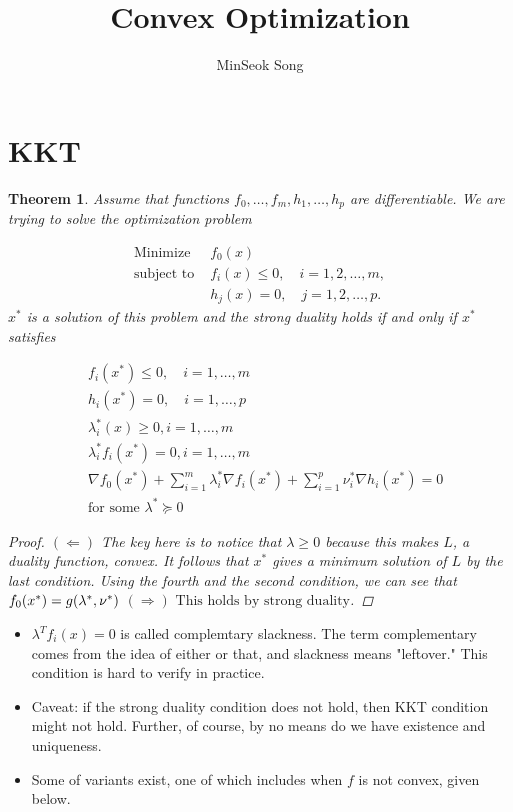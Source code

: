 \documentclass{article}
\title{Convex Optimization}
\author{MinSeok Song}
\date{}
\newtheorem{theorem}{Theorem}
\theoremstyle{remark}
\begin{document}
\maketitle
\section*{KKT}
\begin{theorem}
Assume that functions $f_0,\dots,f_m,h_1,\dots,h_p$ are differentiable. We
 are trying to solve the optimization problem

\begin{align*}
        \text{Minimize } & f_0(x) \\
        \text{subject to } & f_i(x) \leq 0, \quad i = 1, 2, \ldots, m, \\
        & h_j(x) = 0, \quad j = 1, 2, \ldots, p.
        \end{align*}
$x^*$ is a solution of this problem and the strong duality holds if and only if $x^*$ satisfies

\begin{align*}
        & f_i (x^*)\leq 0,\quad i=1,\dots,m\\
        & h_i(x^*)=0,\quad i=1,\dots ,p\\
        & \lambda_i^*(x)\geq 0,i=1,\dots,m\\
        &\lambda_i^* f_i(x^*)=0,i=1,\dots,m\\
        &\nabla f_0(x^*)+\sum^m_{i=1}\lambda_i^*\nabla f_i(x^*)+\sum^p_{i=1}\nu_i^* \nabla h_i(x^*)=0\\
        & \text{for some } \lambda^*\succeq 0
\end{align*}

\begin{proof}
        $(\Leftarrow)$ The key here is to notice that 
        $\lambda \geq 0$ because this makes $L$, a duality function, convex.
        It follows that $x^*$ gives a minimum solution of $L$ by the last condition.
        Using the fourth and the second condition, we can see that 
        $f_0(x^*)=g(\lambda^*,\nu^*)\\\\$
        $(\Rightarrow) \text{ This holds by strong duality}$. 
        \end{proof}
\end{theorem}
\begin{itemize}
\item $\lambda^T f_i(x)=0$ is called complemtary slackness. The term complementary
 comes from the idea of either or that, and slackness means "leftover." This condition is
  hard to verify in practice.
\item Caveat: if the strong duality condition does not hold, then
KKT condition might not hold. Further, of course, by no means do we have existence and uniqueness.
\item Some of variants exist, one of which includes when $f$ is not convex, given below.
\end{itemize}
\end{document}
